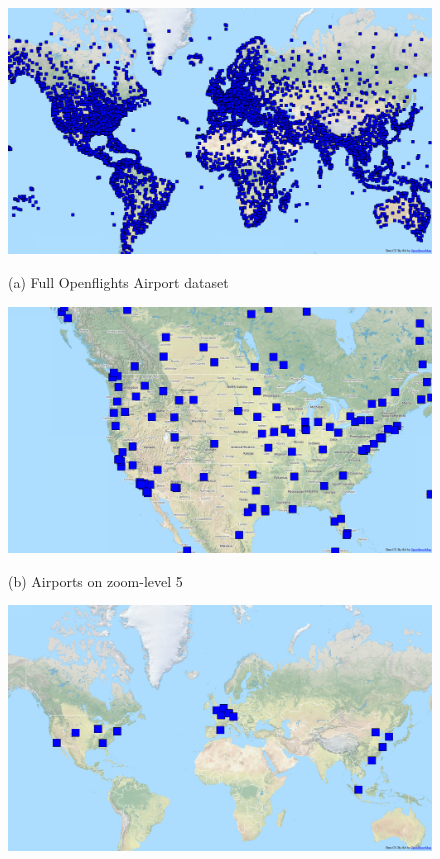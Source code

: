 \documentclass[11pt, oneside]{report}
\begin{document}
\begin{figure}[tb]
  \begin{minipage}{0.329\linewidth}
    \centerline{\includegraphics[width=0.95\linewidth]{./figs-cvl/airports.png}}
    \centerline{(a) Full Openflights Airport dataset}
  \end{minipage} \hfill
  \begin{minipage}{0.329\linewidth}
    \centerline{\includegraphics[width=0.95\linewidth]{./figs-cvl/airports_z4.png}}
    \centerline{(b) Airports on zoom-level 5}
  \end{minipage} \hfill
  \begin{minipage}{0.329\linewidth}
    \centerline{\includegraphics[width=0.95\linewidth]{./figs-cvl/airports_z0.png}}

\end{minipage}
\end{figure}
\end{document}
